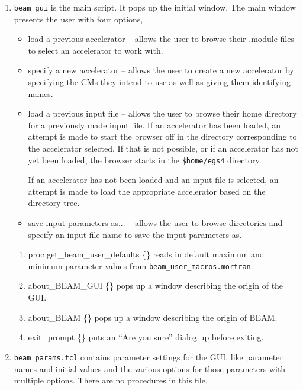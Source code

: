 \documentclass[12pt]{book}
\begin{document}
\begin{enumerate}
\item {\tt beam\_gui} is the main script.  It pops up the initial window.
The main window presents the user with four options,

\begin{itemize}
\item load a previous accelerator -- allows the user to browse their
.module files to select an accelerator to work with.

\item specify a new accelerator -- allows the user to create a new
accelerator by specifying the CMs they intend to use as well as giving
them identifying names.

\item load a previous input file -- allows the user to browse their home
directory for a previously made input file.  If an accelerator has been
loaded, an attempt is made to start the browser off in the directory
corresponding to the accelerator selected.  If that is not possible, or
if an accelerator has not yet been loaded, the browser starts in the
{\tt \$home/egs4} directory.

If an accelerator has not been loaded and an input file is selected, an
attempt is made to load the appropriate accelerator based on the
directory tree.

\item save input parameters as... -- allows the user to browse
directories and specify an input file name to save the input parameters
as.
\end{itemize}
\begin{enumerate}
\item {\sf proc get\_beam\_user\_defaults \{\}} reads in default maximum
and minimum parameter values from {\tt beam\_user\_macros.mortran}.
\item {\sf about\_BEAM\_GUI \{\}} pops up a window describing the origin
of the GUI.
\item {\sf about\_BEAM \{\}} pops up a window describing the origin
of BEAM.
\item {\sf exit\_prompt \{\}} puts an ``Are you sure'' dialog up before exiting.
\end{enumerate}

\item {\tt beam\_params.tcl} contains parameter settings for the GUI,
like parameter names
and initial values and the various options for those parameters with
multiple options.  There are no procedures in this file.


\end{enumerate}
\end{document}
